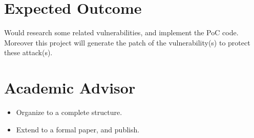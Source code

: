 \documentclass[12pt,a4paper,oneside]{IEEEconf}
\begin{document}

\section{Expected Outcome}
Would research some related vulnerabilities, and implement the PoC code.
Moreover this project will generate the patch of the vulnerability(s) to protect these attack(s).

\printbibheading[heading=bibnumbered]
\printbibliography\newrefcontext

\section{Academic Advisor}
\begin{itemize}
  \item Organize to a complete structure.
  \item Extend to a formal paper, and publish.
\end{itemize}
\end{document}
